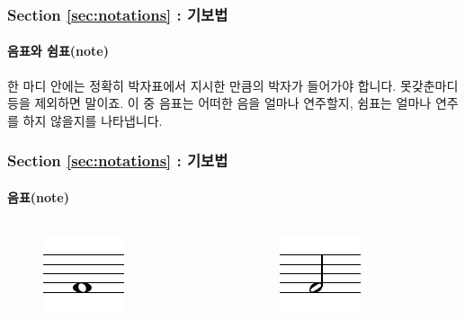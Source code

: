 \documentclass{beamer}
\begin{document}
	\begin{frame}
		\frametitle{Section \ref{sec:notations} : 기보법}
		\framesubtitle{음표와 쉼표(note)}
		한 마디 안에는 정확히 박자표에서 지시한 만큼의 박자가 들어가야 합니다. 못갖춘마디 등을 제외하면 말이죠. 이 중 음표는 어떠한 음을 얼마나 연주할지, 쉼표는 얼마나 연주를 하지 않을지를 나타냅니다.\\
	\end{frame}
	
	\begin{frame}
		\frametitle{Section \ref{sec:notations} : 기보법}
		\framesubtitle{음표(note)}
		\vskip -1pc
		\begin{columns}
			\begin{column}{0.33\textwidth}
				\centering
				\noindent
				\begin{figure}[h!]
					\includegraphics[width=0.7\columnwidth]{res/pdf/4/note/whole.pdf}
				\end{figure}
			\end{column}
			\begin{column}{0.33\textwidth}
				\centering
				\noindent
				\begin{figure}[h!]
					\includegraphics[width=0.7\columnwidth]{res/pdf/4/note/half.pdf}

\end{figure}
\end{column}
\end{columns}
\end{frame}
\end{document}
